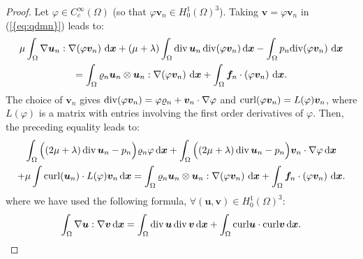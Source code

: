 \documentclass{amsart}
\numberwithin{equation}{section}
\begin{document}
\begin{proof}
\medskip
Let $\varphi \in C^\infty_c(\Omega)$ (so that $\varphi {\bm{v}}_n \in H^1_0(\Omega)^3$). 
Taking ${\bm{v}}=\varphi {\bm{v}}_n $ in {(\ref{{eq:qdmn}})} leads to:
\begin{multline*}
\mu \int_{\Omega} {{\nabla}} {{\boldsymbol u}}_n : {{\nabla}} (\varphi {\bm{v}}_n) \,{\, {\rm d}{{\boldsymbol x}}} +(\mu+\lambda) \int_\Omega \operatorname{div} {{\boldsymbol u}}_n \operatorname{div}( \varphi {\bm{v}}_n) {\, {\rm d}{{\boldsymbol x}}}
  - \int_{\Omega} p_n {{\rm div}} (\varphi {\bm{v}}_n)\, {\, {\rm d}{{\boldsymbol x}}} \\ =  \int_\Omega {\varrho}_n {{\boldsymbol u}}_n \otimes {{\boldsymbol u}}_n : {{\nabla}} (\varphi {\bm{v}}_n)\, {\, {\rm d}{{\boldsymbol x}}}
  +\int _{\Omega} \bm{f}_n \cdot (\varphi {\bm{v}}_n) \,{\, {\rm d}{{\boldsymbol x}}}.
\end{multline*}
The choice of ${\bm{v}}_n$ gives ${{\rm div}}(\varphi {\bm{v}}_n)= \varphi {\varrho}_n  + {\bm{v}}_n \cdot {{\nabla}} \varphi$ and
${{\rm curl}}(\varphi {\bm{v}}_n )=L(\varphi){\bm{v}}_n$, where $L(\varphi)$ is a matrix with entries involving the first order derivatives of $\varphi$.
Then, the preceding equality leads to:
\begin{multline*}
 \int_{\Omega} \Big((2\mu+\lambda)\operatorname{div} {\bm{u}}_n - p_n\Big) {\varrho}_n \varphi {\, {\rm d}{{\boldsymbol x}}} +  \int_{\Omega}\Big((2\mu+\lambda) \operatorname{div} {\bm{u}}_n - p_n\Big) {\bm{v}}_n \cdot {{\nabla}} \varphi {\, {\rm d}{{\boldsymbol x}}} \\ +\mu \int {{\rm curl}}({{\boldsymbol u}}_n) \cdot  L(\varphi) {\bm{v}}_n  {\, {\rm d}{{\boldsymbol x}}} =  \int_\Omega {\varrho}_n {{\boldsymbol u}}_n \otimes {{\boldsymbol u}}_n : {{\nabla}} ( \varphi {\bm{v}}_n)\, {\, {\rm d}{{\boldsymbol x}}}+
\int _{\Omega} \bm{f}_n \cdot (\varphi {\bm{v}}_n) \,{\, {\rm d}{{\boldsymbol x}}}.
\end{multline*}
where we have used the following formula, $\forall ({\bm{u}},{\bm{v}}) \in H_0^1(\Omega)^3 $:
\begin{equation}\label{graddivrot}
\int_\Omega \nabla {\bm{u}} : \nabla {\bm{v}} {\, {\rm d}{{\boldsymbol x}}} = \int_\Omega \operatorname{div} {\bm{u}} \operatorname{div} {\bm{v}} {\, {\rm d}{{\boldsymbol x}}} + \int_\Omega {{\rm curl}} {\bm{u}} \cdot {{\rm curl}} {\bm{v}} {\, {\rm d}{{\boldsymbol x}}}.
\end{equation}


\end{proof}
\end{document}
